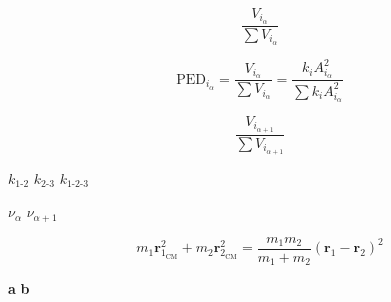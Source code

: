 \documentclass[20pt]{article}
\begin{document}
\baselineskip=40pt

{\Huge

\begin{equation}
\frac{V_{i_{\alpha}}}{\sum V_{i_{\alpha}}}
\end{equation}

\begin{equation}
\textrm{PED}_{i_{\alpha}} = \frac{V_{i_{\alpha}}}{\sum V_{i_{\alpha}}} = \frac{k_i A^2_{i_{\alpha}}}{\sum k_i A^2_{i_{\alpha}}}
\end{equation}

\begin{equation}
\frac{V_{i_{\alpha+1}}}{\sum V_{i_{\alpha+1}}}
\end{equation}

$k_{\textrm{1-2}}$
$k_{\textrm{2-3}}$
$k_{\textrm{1-2-3}}$

$\nu_\alpha$ $\nu_{\alpha+1}$

\begin{equation}
\label{eq:12KED}
m_1\boldsymbol{r}^2_{1_{\textrm{CM}}} + m_2\boldsymbol{r}^2_{2_{\textrm{CM}}} = 
\frac{m_1 m_2}{m_1 + m_2} (\boldsymbol{r}_{1} - \boldsymbol{r}_{2})^2
\end{equation}

{\bf a} {\bf b}


}
\end{document}
